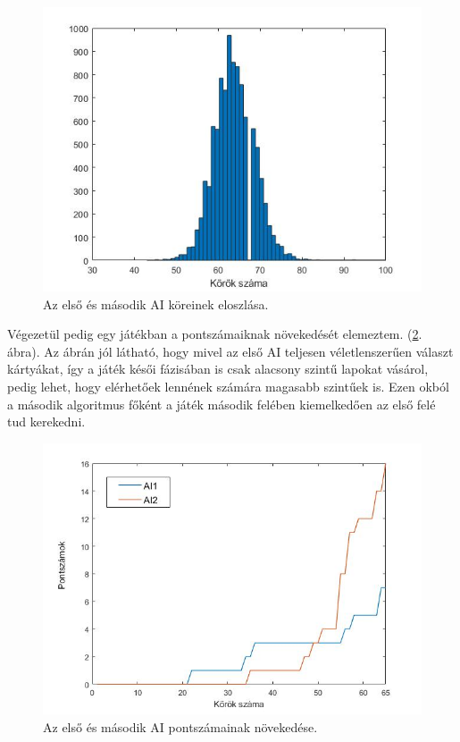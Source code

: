 \begin{figure}[H]
\centering
\includegraphics[scale=0.6]{images/round_number_hist_AI1vsAI2.jpg}
\caption{Az első és második AI köreinek eloszlása.}
\label{fig:rounds1v2}
\end{figure}

Végezetül pedig egy játékban a pontszámaiknak növekedését elemeztem. (\ref{fig:player_scores1v2}. ábra). Az ábrán jól látható, hogy mivel az első AI teljesen véletlenszerűen választ kártyákat, így a játék késői fázisában is csak alacsony szintű lapokat vásárol, pedig lehet, hogy elérhetőek lennének számára magasabb szintűek is. Ezen okból a második algoritmus főként a játék második felében kiemelkedően az első felé tud kerekedni.

\begin{figure}[H]
\centering
\includegraphics[scale=0.6]{images/player_points_AI1vsAI2.jpg}
\caption{Az első és második AI pontszámainak növekedése.}
\label{fig:player_scores1v2}
\end{figure}

